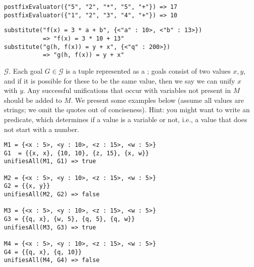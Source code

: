 
\begin{verbatim}
postfixEvaluator({"5", "2", "*", "5", "+"}) => 17
postfixEvaluator({"1", "2", "3", "4", "+"}) => 10
\end{verbatim}


\begin{verbatim}
substitute("f(x) = 3 * a + b", {<"a" : 10>, <"b" : 13>})
           => "f(x) = 3 * 10 + 13"
substitute("g(h, f(x)) = y + x", {<"q" : 200>})          
           => "g(h, f(x)) = y + x" 
\end{verbatim}

 $\mathcal{G}$. Each goal $G \in \mathcal{G}$ is a tuple represented as a ; goals consist of two values $x, y$, and if it is possible for these to be the same value, then we say we can unify $x$ with $y$. Any successful unifications that occur with variables not present in $M$ should be added to $M$. We present some examples below (assume all values are strings; we omit the quotes out of conciseness). Hint: you might want to write an  predicate, which determines if a value is a variable or not, i.e., a value that does not start with a number.

\begin{verbatim}
M1 = {<x : 5>, <y : 10>, <z : 15>, <w : 5>}
G1  = {{x, x}, {10, 10}, {z, 15}, {x, w}}
unifiesAll(M1, G1) => true

M2 = {<x : 5>, <y : 10>, <z : 15>, <w : 5>}
G2 = {{x, y}}
unifiesAll(M2, G2) => false

M3 = {<x : 5>, <y : 10>, <z : 15>, <w : 5>}
G3 = {{q, x}, {w, 5}, {q, 5}, {q, w}}
unifiesAll(M3, G3) => true

M4 = {<x : 5>, <y : 10>, <z : 15>, <w : 5>}
G4 = {{q, x}, {q, 10}}
unifiesAll(M4, G4) => false
\end{verbatim}

